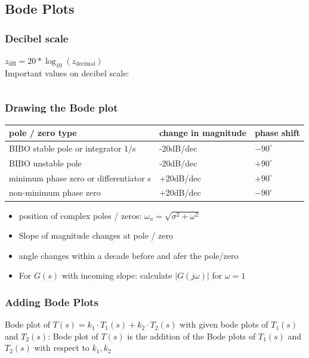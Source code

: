\subsection{Bode Plots}
    \subsubsection{Decibel scale}
        $z_{\text{dB}} = 20 * \log_{10}(z_{\text{decimal}})$\\
        Important values on decibel scale:
        \begin{tabu}{X X}
            
        \end{tabu}
    
    \subsubsection{Drawing the Bode plot}
        \begin{tabu}{| X | X | X |}
            \hline
            pole / zero type & change in magnitude & phase shift\\
            \hline \hline
            BIBO stable pole or integrator 1/s & -20dB/dec & $-90^{\circ}$\\
            \hline
            BIBO unstable pole & -20dB/dec & $+90^{\circ}$\\
            \hline
            minimum phase zero or differentiator s & +20dB/dec & $+90^{\circ}$\\
            \hline
            non-minimum phase zero & +20dB/dec & $-90^{\circ}$\\
            \hline
        \end{tabu}
        \begin{itemize}
            \item position of complex poles / zeros: $\omega_n = \sqrt{\sigma^2 + \omega^2}$
            \item Slope of magnitude changes at pole / zero
            \item angle changes within a decade before and afer the pole/zero
            \item For $G(s)$ with incoming slope: calculate $|G(j \omega)|$ for $\omega = 1$
        \end{itemize}
        



    \subsubsection{Adding Bode Plots}
        Bode plot of $T(s) = k_1 \cdot T_1(s) + k_2 \cdot T_2(s)$ with given bode plots of $T_1(s)$ and $T_2(s)$:
        Bode plot of $T(s)$ is the addition of the Bode plots of $T_1(s)$ and $T_2(s)$ with respect to $k_1, k_2$

